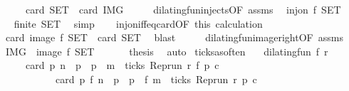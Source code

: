 \begin{isabellebody}
\ \ \ \ {\isacharparenleft}\ {\isacartoucheopen}card\ {\isacharquery}SET\ {\isacharequal}\ card\ {\isacharquery}IMG{\isacartoucheclose}{\isacharparenright}\isanewline
%
\isadelimproof
%
\endisadelimproof
%
\isatagproof
{}\isamarkupfalse%
\ {\isacharminus}\isanewline
\ \ \isamarkupfalse%
\ dilating{\isacharunderscore}fun{\isacharunderscore}injects{\isacharbrackleft}OF\ assms{\isacharbrackright}\ \isamarkupfalse%
\ {\isacartoucheopen}inj{\isacharunderscore}on\ f\ {\isacharquery}SET{\isacartoucheclose}\ \isacommand{{\isachardot}}\isamarkupfalse%
\isanewline
\ \ \isamarkupfalse%
\ \isamarkupfalse%
\ {\isacartoucheopen}finite\ {\isacharquery}SET{\isacartoucheclose}\ \isamarkupfalse%
\ simp\isanewline
\ \ \isamarkupfalse%
\ inj{\isacharunderscore}on{\isacharunderscore}iff{\isacharunderscore}eq{\isacharunderscore}card{\isacharbrackleft}OF\ this{\isacharbrackright}\ calculation\isanewline
\ \ \ \ \isamarkupfalse%
\ {\isacartoucheopen}card\ {\isacharparenleft}image\ f\ {\isacharquery}SET{\isacharparenright}\ {\isacharequal}\ card\ {\isacharquery}SET{\isacartoucheclose}\ \isamarkupfalse%
\ blast\isanewline
\ \ \isamarkupfalse%
\ \isamarkupfalse%
\ dilating{\isacharunderscore}fun{\isacharunderscore}image{\isacharunderscore}right{\isacharbrackleft}OF\ assms{\isacharbrackright}\ \isamarkupfalse%
\ {\isacartoucheopen}{\isacharquery}IMG\ {\isacharequal}\ image\ f\ {\isacharquery}SET{\isacartoucheclose}\ \isacommand{{\isachardot}}\isamarkupfalse%
\isanewline
\ \ \isamarkupfalse%
\ \isamarkupfalse%
\ {\isacharquery}thesis\ \isamarkupfalse%
\ auto\isanewline
{}\isamarkupfalse%
%
\endisatagproof
{\isafoldproof}%
%
\isadelimproof
\isanewline
%
\endisadelimproof
\isanewline
{}\isamarkupfalse%
\ ticks{\isacharunderscore}as{\isacharunderscore}often{\isacharcolon}\isanewline
\ \ \ {\isacartoucheopen}dilating{\isacharunderscore}fun\ f\ r{\isacartoucheclose}\isanewline
\ \ \ \ \ {\isacartoucheopen}card\ {\isacharbraceleft}p{\isachardot}\ n\ {\isasymle}\ p\ {\isasymand}\ p\ {\isasymle}\ m\ {\isasymand}\ ticks\ {\isacharparenleft}{\isacharparenleft}Rep{\isacharunderscore}run\ r{\isacharparenright}\ {\isacharparenleft}f\ p{\isacharparenright}\ c{\isacharparenright}{\isacharbraceright}\isanewline
\ \ \ \ \ \ \ \ \ \ {\isacharequal}\ card\ {\isacharbraceleft}p{\isachardot}\ f\ n\ {\isasymle}\ p\ {\isasymand}\ p\ {\isasymle}\ f\ m\ {\isasymand}\ ticks\ {\isacharparenleft}{\isacharparenleft}Rep{\isacharunderscore}run\ r{\isacharparenright}\ p\ c{\isacharparenright}{\isacharbraceright}{\isacartoucheclose}\isanewline

\end{isabellebody}
